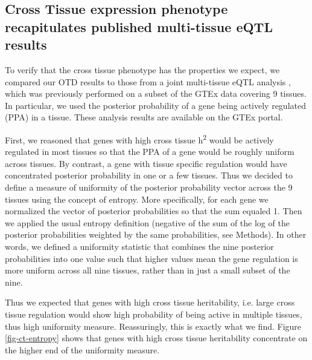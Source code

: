 \documentclass[10pt,letterpaper]{article}
\begin{document}
\subsection*{Cross Tissue expression phenotype recapitulates published multi-tissue eQTL results}

To verify that the cross tissue phenotype has the properties we expect, we compared our OTD results to those from a joint multi-tissue eQTL analysis  \cite{Flutre_2013}, which was previously performed on a subset of the GTEx data \cite{Ardlie_2015} covering 9 tissues. In particular, we used the posterior probability of a gene being actively regulated  (PPA) in a tissue. These analysis results are available on the GTEx portal.

First, we reasoned that genes with high cross tissue h\textsuperscript{2} would be actively regulated in most tissues so that the PPA of a gene would be roughly uniform across tissues. By contrast, a gene with tissue specific regulation would have concentrated posterior probability in one or a few tissues. Thus we decided to define a measure of uniformity of the posterior probability vector across the 9 tissues using the concept of entropy. More specifically, for each gene we normalized the vector of posterior probabilities so that the sum equaled 1. Then we applied the usual entropy definition (negative of the sum of the log of the posterior probabilities weighted by the same probabilities, see Methods). In other words, we defined a uniformity statistic that combines the nine posterior probabilities into one value such that higher values mean the gene regulation is more uniform across all nine tissues, rather than in just a small subset of the nine.

Thus we expected that genes with high cross tissue heritability, i.e. large cross tissue regulation would show high probability of being active in multiple tissues, thus high uniformity measure. Reassuringly, this is exactly what we find.
Figure \ref{fig-ct-entropy} shows that genes with high cross tissue heritability concentrate on the higher end of the uniformity measure. 
\end{document}
